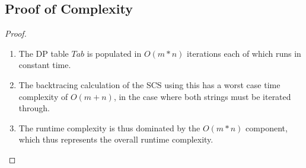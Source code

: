\documentclass{article}
\begin{document}
\subsection{Proof of Complexity}
\begin{proof}
      \begin{enumerate}
            \item The DP table $Tab$ is populated in $O(m*n)$ iterations each of which
                  runs in constant time.
            \item The backtracing calculation of the SCS using this has a worst case time
                  complexity of $O(m+n)$, in the case where both strings must be iterated
                  through.
            \item The runtime complexity is thus dominated by the $O(m*n)$ component,
                  which thus represents the overall runtime complexity.
      \end{enumerate}


\end{proof}
\end{document}
